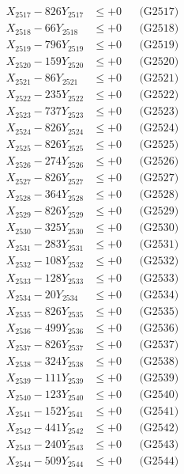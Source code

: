 \documentclass[a4paper,10pt]{article}
\begin{document}
{\begin{align}
X_{2517} - 826Y_{2517} &\leq +0 && \text{(G2517)} \\
X_{2518} - 66Y_{2518} &\leq +0 && \text{(G2518)} \\
X_{2519} - 796Y_{2519} &\leq +0 && \text{(G2519)} \\
X_{2520} - 159Y_{2520} &\leq +0 && \text{(G2520)} \\
\allowbreak
X_{2521} - 86Y_{2521} &\leq +0 && \text{(G2521)} \\
X_{2522} - 235Y_{2522} &\leq +0 && \text{(G2522)} \\
X_{2523} - 737Y_{2523} &\leq +0 && \text{(G2523)} \\
X_{2524} - 826Y_{2524} &\leq +0 && \text{(G2524)} \\
X_{2525} - 826Y_{2525} &\leq +0 && \text{(G2525)} \\
X_{2526} - 274Y_{2526} &\leq +0 && \text{(G2526)} \\
X_{2527} - 826Y_{2527} &\leq +0 && \text{(G2527)} \\
X_{2528} - 364Y_{2528} &\leq +0 && \text{(G2528)} \\
X_{2529} - 826Y_{2529} &\leq +0 && \text{(G2529)} \\
X_{2530} - 325Y_{2530} &\leq +0 && \text{(G2530)} \\
\allowbreak
X_{2531} - 283Y_{2531} &\leq +0 && \text{(G2531)} \\
X_{2532} - 108Y_{2532} &\leq +0 && \text{(G2532)} \\
X_{2533} - 128Y_{2533} &\leq +0 && \text{(G2533)} \\
X_{2534} - 20Y_{2534} &\leq +0 && \text{(G2534)} \\
X_{2535} - 826Y_{2535} &\leq +0 && \text{(G2535)} \\
X_{2536} - 499Y_{2536} &\leq +0 && \text{(G2536)} \\
X_{2537} - 826Y_{2537} &\leq +0 && \text{(G2537)} \\
X_{2538} - 324Y_{2538} &\leq +0 && \text{(G2538)} \\
X_{2539} - 111Y_{2539} &\leq +0 && \text{(G2539)} \\
X_{2540} - 123Y_{2540} &\leq +0 && \text{(G2540)} \\
\allowbreak
X_{2541} - 152Y_{2541} &\leq +0 && \text{(G2541)} \\
X_{2542} - 441Y_{2542} &\leq +0 && \text{(G2542)} \\
X_{2543} - 240Y_{2543} &\leq +0 && \text{(G2543)} \\
X_{2544} - 509Y_{2544} &\leq +0 && \text{(G2544)} \\

\end{align}}
\end{document}
